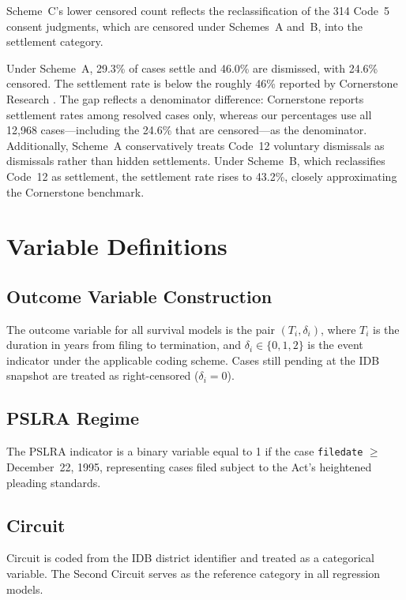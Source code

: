 Scheme~C's lower censored count reflects the reclassification
of the 314 Code~5 consent judgments, which are censored
under Schemes~A and~B, into the settlement category.

Under Scheme~A, 29.3\% of cases settle and 46.0\% are
dismissed, with 24.6\% censored. The settlement rate is
below the roughly 46\% reported by Cornerstone Research
\citep{cornerstone2024}. The gap reflects a denominator
difference: Cornerstone reports settlement rates among
resolved cases only, whereas our percentages use all
12,968 cases---including the 24.6\% that are censored---as
the denominator. Additionally, Scheme~A conservatively
treats Code~12 voluntary dismissals as dismissals rather
than hidden settlements. Under Scheme~B, which reclassifies
Code~12 as settlement, the settlement rate rises to
43.2\%, closely approximating the Cornerstone benchmark.

\section{Variable Definitions}

\subsection{Outcome Variable Construction}

The outcome variable for all survival models is the pair
$(T_i, \delta_i)$, where $T_i$ is the duration in years from filing 
to termination, and $\delta_i \in \{0, 1, 2\}$ is the event indicator 
under the applicable coding scheme. Cases still pending at the IDB 
snapshot are treated as right-censored ($\delta_i = 0$).

\subsection{PSLRA Regime}

The PSLRA indicator is a binary variable equal to 1 if the case 
\texttt{filedate} $\geq$ December~22, 1995, representing cases filed 
subject to the Act's heightened pleading standards.

\subsection{Circuit}

Circuit is coded from the IDB district identifier and treated
as a categorical variable. The Second Circuit serves as the
reference category in all regression models.

